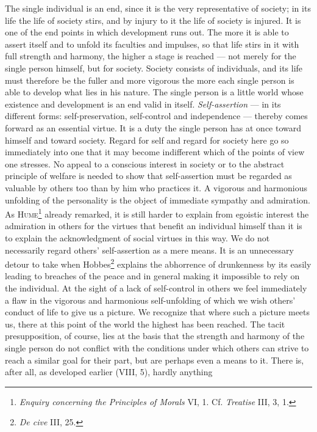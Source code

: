 \documentclass[12pt,a4paper,openany]{book}
\newcommand{\opage}[1]{\marginnote{\footnotesize\textit{[#1]}}}
\begin{document}
The single individual is an end, since it is the very representative of society; in its life the life of
society stirs, and by injury to it the life of society is injured. It is one of the end points in which
development runs out. The more it is able to assert itself and to unfold its faculties and impulses, so that
life stirs in it with full strength and harmony, the higher a stage is reached --- not merely for the single
person himself, but for society. Society consists of individuals, and its life must therefore be the fuller and
more vigorous the more each single person is able to develop what lies in his nature. The single person is a
little world whose existence and development is an end valid in itself. \textit{Self-assertion} --- in its
different forms: self-preservation, self-control and independence --- thereby comes forward as an essential
virtue. It is a duty the single person has at once toward himself and toward society. Regard for self and regard
for society here go so immediately into one that it
\opage{184}may become indifferent which of the points of view one stresses. No appeal to a conscious interest in
society or to the abstract principle of welfare is needed to show that self-assertion must be regarded as
valuable by others too than by him who practices it. A vigorous and harmonious unfolding of the personality is
the object of immediate sympathy and admiration. As \textsc{Hume}\footnote[1]{\textit{Enquiry concerning the
Principles of Morals} VI, 1. Cf. \textit{Treatise} III, 3, 1.} already remarked, it is still harder to explain
from egoistic interest the admiration in others for the virtues that benefit an individual himself than it is to
explain the acknowledgment of social virtues in this way. We do not necessarily regard others' self-assertion as
a mere means. It is an unnecessary detour to take when Hobbes\footnote[2]{\textit{De cive} III, 25.} explains
the abhorrence of drunkenness by its easily leading to breaches of the peace and in general making it
impossible to rely on the individual. At the sight of a lack of self-control in others we feel immediately a
flaw in the vigorous and harmonious self-unfolding of which we wish others' conduct of life to give us a
picture. We recognize that where such a picture meets us, there at this point of the world the highest has been
reached. The tacit presupposition, of course, lies at the basis that the strength and harmony of the single
person do not conflict with the conditions under which others can strive to reach a similar goal for their
part, but are perhaps even a means to it. There is, after all, as developed earlier (VIII, 5), hardly anything
\end{document}
